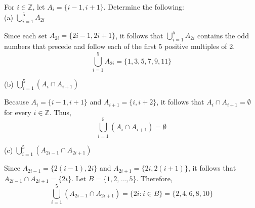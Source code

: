\documentclass[12pt]{article}
\newcommand{\Z}{\mathbb{Z}}
\newenvironment{problem}[2][Problem]{\begin{trivlist}
		\item[\hskip \labelsep {\bfseries #1}\hskip \labelsep {\bfseries #2.}]}{\end{trivlist}}
\newenvironment{solution}[2][Solution]{\begin{trivlist}
		\item[\hskip \labelsep {\bfseries #1}\hskip \labelsep {\bfseries #2.}]}{\end{trivlist}}
\begin{document}
	\begin{problem}{40}
		For $i \in \Z$, let $A_{i} = \{i-1, i+1\}$. Determine the following:\\
		
		(a) $\bigcup\limits_{i=1}^{5}A_{2i}$
		\begin{solution}{a}
			Since each set $A_{2i} = \{2i-1, 2i+1\}$, it follows that $\bigcup_{i=1}^{5}A_{2i}$ contains the odd numbers that precede and follow each of the first 5 positive multiples of 2.
			\begin{equation*}
				\bigcup\limits_{i=1}^{5}A_{2i} = \{1,3,5,7,9,11\}
			\end{equation*}
		\end{solution}
	
		(b) $\bigcup\limits_{i=1}^{5}(A_{i}\cap A_{i+1})$
		\begin{solution}{b}
			Because $A_{i}=\{i-1,i+1\}$ and $A_{i+1}=\{i,i+2\}$, it follows that $A_{i} \cap A_{i+1} = \emptyset$ for every $i\in \Z$. Thus,
			\begin{equation*}
				\bigcup\limits_{i=1}^{5}(A_{i}\cap A_{i+1}) = \emptyset
			\end{equation*}
		\end{solution}
	
		(c)  $\bigcup\limits_{i=1}^{5}(A_{2i-1}\cap A_{2i+1})$
		\begin{solution}{c}
			Since $A_{2i-1}=\{2(i-1),2i\}$ and $A_{2i+1}=\{2i,2(i+1)\}$, it follows that $A_{2i-1}\cap A_{2i+1} = \{2i\}$. Let $B=\{1,2,\ldots,5\}$. Therefore,
			\begin{equation*}
				\bigcup\limits_{i=1}^{5}(A_{2i-1}\cap A_{2i+1}) =\{2i: i\in B\} = \{2,4,6,8,10\}
			\end{equation*}
		\end{solution}
	\end{problem}
\end{document}
